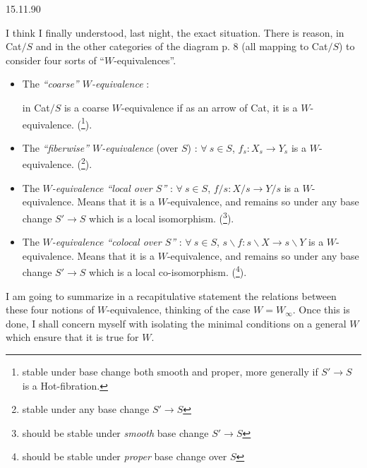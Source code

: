 \documentclass[11pt]{article}
\newcommand{\printedpage}[1]{\marginpar{\footnotesize p.~#1}}
\newcommand{\msp}[1]{\marginpar{\footnotesize [#1]}}
\begin{document}
\printedpage{24}

\msp{page 41}

\begin{flushright}
15.11.90
\end{flushright}

I think I finally understood, last night, the exact situation. There is reason, in Cat$/S$ and in the other categories of the diagram p. 8 (all mapping to Cat$/S$) to consider four sorts of ``$W$-equivalences''. %

\begin{itemize}
\item[a)] The \textit{``coarse'' $W$-equivalence} :  in Cat$/S$ is a coarse $W$-equivalence if as an arrow of Cat, it is a $W$-equivalence. (\footnote[17]{stable under base change both smooth and proper, more generally if $S' \longrightarrow S$ is a Hot-fibration.}).

\item[b)] The \textit{``fiberwise'' $W$-equivalence} (over $S$) : $\forall\ s \in S$, $f_s : X_s \longrightarrow Y_s$ is a $W$-equivalence. (\footnote[18]{stable under any base change $S' \longrightarrow S$}). %

\item[c)] The \textit{$W$-equivalence ``local over $S$''} : $\forall\ s \in S$, $f/s : X/s \longrightarrow Y/s$ is a $W$-equivalence. Means that it is a $W$-equivalence, and remains so under any base change $S' \longrightarrow S$ which is a local isomorphism. (\footnote[19]{should be stable under \textit{smooth} base change $S' \longrightarrow S$}).

\item[c$'$)] The \textit{$W$-equivalence ``colocal over $S$''} : $\forall\ s \in S$, $s\backslash f : s\backslash X \longrightarrow s\backslash Y$ is a $W$-equivalence. Means that it is a $W$-equivalence, and remains so under any base change $S' \longrightarrow S$ which is a local co-isomorphism. (\footnote[20]{should be stable under \textit{proper} base change over $S$}).
\end{itemize}

I am going to summarize in a recapitulative statement the relations between these four notions of $W$-equivalence, thinking of the case $W = W_\infty$. Once this is done, I shall concern myself with isolating the minimal conditions on a general $W$ which ensure that it is true for $W$.
\end{document}

